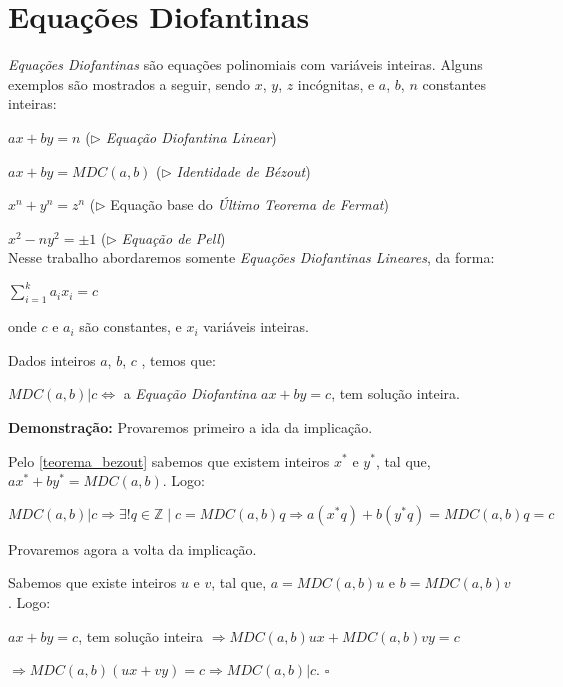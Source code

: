 \section{Equações Diofantinas}

\textit{Equações Diofantinas} são equações polinomiais com variáveis inteiras. Alguns exemplos são mostrados a seguir, sendo $x$, $y$, $z$ incógnitas, e $a$, $b$, $n$ constantes inteiras:

$ax + by = n$ ($\triangleright$ \textit{Equação Diofantina Linear})

$ax + by = MDC(a,b)$ ($\triangleright$ \textit{Identidade de Bézout})

$x^n + y^n = z^n$ ($\triangleright$ Equação base do \textit{Último Teorema de Fermat})

$x^2 - ny^2 = \pm 1$ ($\triangleright$ \textit{Equação de Pell})\\



Nesse trabalho abordaremos somente \textit{Equações Diofantinas Lineares}, da forma:

$\sum_{i=1}^{k}a_i x_i = c$

onde $c$ e $a_i$ são constantes, e $x_i$ variáveis inteiras.\\


\begin{theorem}\label{equacao_diofantina_implicacao}
Dados inteiros $a$, $b$, $c$ , temos que:

$MDC(a,b)|c \Leftrightarrow$ a \textit{Equação Diofantina} $ax + by=c$, tem solução inteira.
\end{theorem}
\textbf{Demonstração:}
Provaremos primeiro a ida da implicação.

Pelo \autoref{teorema_bezout} sabemos que existem inteiros $x^*$ e $y^*$, tal que, $ax^* + by^* = MDC(a,b)$. Logo:

$MDC(a,b)|c \Rightarrow \exists! q\in\mathbb{Z} \mid c = MDC(a,b)q \Rightarrow a(x^*q) + b(y^*q) = MDC(a,b)q = c$ 

Provaremos agora a volta da implicação.

Sabemos que existe inteiros $u$ e $v$, tal que, $a=MDC(a,b)u$ e $b=MDC(a,b)v$. Logo:

$ax + by=c$, tem solução inteira $\Rightarrow MDC(a,b)ux + MDC(a,b)vy = c$

$\Rightarrow MDC(a,b)(ux + vy) = c \Rightarrow MDC(a,b)|c$. $\square$ 



